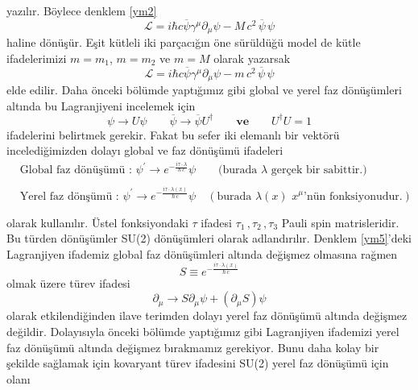 yazılır. Böylece denklem \eqref{ym2} 
\begin{equation} \label{ym5}
\mathcal{L} = i\hbar c\overline{\psi}\gamma^{\mu}\partial_{\mu} \psi - M\,c^{2}\,\overline{\psi}\,\psi
\end{equation}
haline dönüşür. Eşit kütleli iki parçacığın öne sürüldüğü model de  kütle ifadelerimizi $m = m_{1}$, $m = m_{2}$ ve $m = M$ olarak yazarsak
\begin{equation} \label{ym6}
\mathcal{L} = i\hbar c\overline{\psi}\gamma^{\mu}\partial_{\mu} \psi - m\,c^{2}\,\overline{\psi}\,\psi
\end{equation} 
elde edilir. Daha önceki bölümde yaptığımız gibi global ve yerel faz dönüşümleri altında bu Lagranjiyeni incelemek için
\begin{equation} \label{ym7}
\psi \to U\psi \qquad \overline{\psi} \to \overline{\psi}U^{\dag}\qquad \textbf{ve} \qquad U^{\dag}U = 1
\end{equation}
ifadelerini belirtmek gerekir. Fakat bu sefer iki elemanlı bir vektörü incelediğimizden dolayı global ve faz dönüşümü ifadeleri
\begin{equation*}  
\begin{aligned}
&\textrm{Global faz dönüşümü : }\psi^{'} \to e^{- \frac{i\tau \cdot \lambda}{\hbar\, c} }\psi \qquad \textrm{(burada } \lambda \textrm{ gerçek bir sabittir.)}   \\
\\
&\textrm{Yerel faz dönşümü : } \psi^{'} \to e^{-\frac{i\tau \cdot \lambda(x)}{\hbar\, c}}\psi \quad (\textrm{burada }\lambda(x) \,\, x^{\mu}\textrm{'nün fonksiyonudur.}) \\
\\
\end{aligned}
\end{equation*}
olarak kullanılır. Üstel fonksiyondaki  $\tau$ ifadesi $\tau_{1}\,,\tau_{2}\,,\tau_{3}$ Pauli spin matrisleridir. Bu türden dönüşümler SU(2) dönüşümleri olarak adlandırılır. Denklem \eqref{ym5}'deki Lagranjiyen ifademiz global faz dönüşümleri altında değişmez olmasına rağmen
\begin{equation} \label{ym8}
S \equiv e^{-\frac{i\tau \cdot \lambda(x)}{\hbar\, c}}
\end{equation}
olmak üzere türev ifadesi
\begin{equation} \label{ym9}
\partial_{\mu} \to S\partial_{\mu}\psi + (\partial_{\mu}S)\psi
\end{equation}
olarak etkilendiğinden ilave terimden dolayı yerel faz dönüşümü altında değişmez değildir. Dolayısıyla önceki bölümde yaptığımız gibi Lagranjiyen ifademizi yerel faz dönüşümü altında değişmez bırakmamız gerekiyor. Bunu daha kolay bir şekilde sağlamak için kovaryant türev ifadesini SU(2) yerel faz dönüşümü için olanı
